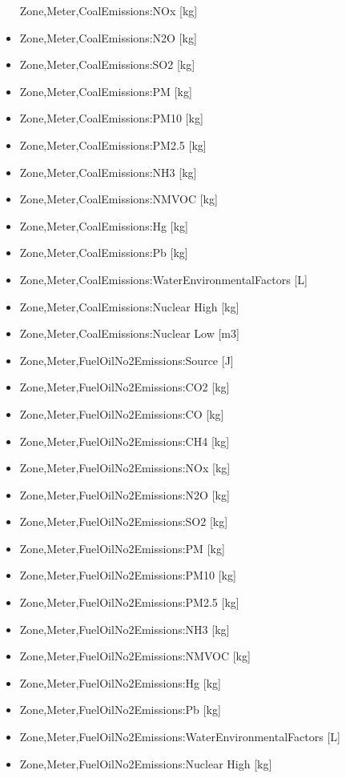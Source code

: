 \begin{itemize}
  Zone,Meter,CoalEmissions:NOx {[}kg{]}
\item
  Zone,Meter,CoalEmissions:N2O {[}kg{]}
\item
  Zone,Meter,CoalEmissions:SO2 {[}kg{]}
\item
  Zone,Meter,CoalEmissions:PM {[}kg{]}
\item
  Zone,Meter,CoalEmissions:PM10 {[}kg{]}
\item
  Zone,Meter,CoalEmissions:PM2.5 {[}kg{]}
\item
  Zone,Meter,CoalEmissions:NH3 {[}kg{]}
\item
  Zone,Meter,CoalEmissions:NMVOC {[}kg{]}
\item
  Zone,Meter,CoalEmissions:Hg {[}kg{]}
\item
  Zone,Meter,CoalEmissions:Pb {[}kg{]}
\item
  Zone,Meter,CoalEmissions:WaterEnvironmentalFactors {[}L{]}
\item
  Zone,Meter,CoalEmissions:Nuclear High {[}kg{]}
\item
  Zone,Meter,CoalEmissions:Nuclear Low {[}m3{]}
\item
  Zone,Meter,FuelOilNo2Emissions:Source {[}J{]}
\item
  Zone,Meter,FuelOilNo2Emissions:CO2 {[}kg{]}
\item
  Zone,Meter,FuelOilNo2Emissions:CO {[}kg{]}
\item
  Zone,Meter,FuelOilNo2Emissions:CH4 {[}kg{]}
\item
  Zone,Meter,FuelOilNo2Emissions:NOx {[}kg{]}
\item
  Zone,Meter,FuelOilNo2Emissions:N2O {[}kg{]}
\item
  Zone,Meter,FuelOilNo2Emissions:SO2 {[}kg{]}
\item
  Zone,Meter,FuelOilNo2Emissions:PM {[}kg{]}
\item
  Zone,Meter,FuelOilNo2Emissions:PM10 {[}kg{]}
\item
  Zone,Meter,FuelOilNo2Emissions:PM2.5 {[}kg{]}
\item
  Zone,Meter,FuelOilNo2Emissions:NH3 {[}kg{]}
\item
  Zone,Meter,FuelOilNo2Emissions:NMVOC {[}kg{]}
\item
  Zone,Meter,FuelOilNo2Emissions:Hg {[}kg{]}
\item
  Zone,Meter,FuelOilNo2Emissions:Pb {[}kg{]}
\item
  Zone,Meter,FuelOilNo2Emissions:WaterEnvironmentalFactors {[}L{]}
\item
  Zone,Meter,FuelOilNo2Emissions:Nuclear High {[}kg{]}

\end{itemize}
